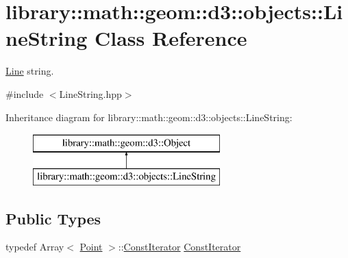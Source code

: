\hypertarget{classlibrary_1_1math_1_1geom_1_1d3_1_1objects_1_1_line_string}{}\section{library\+:\+:math\+:\+:geom\+:\+:d3\+:\+:objects\+:\+:Line\+String Class Reference}
\label{classlibrary_1_1math_1_1geom_1_1d3_1_1objects_1_1_line_string}


\hyperlink{classlibrary_1_1math_1_1geom_1_1d3_1_1objects_1_1_line}{Line} string.  




{\ttfamily \#include $<$Line\+String.\+hpp$>$}

Inheritance diagram for library\+:\+:math\+:\+:geom\+:\+:d3\+:\+:objects\+:\+:Line\+String\+:\begin{figure}[H]
\begin{center}
\leavevmode
\includegraphics[height=2.000000cm]{classlibrary_1_1math_1_1geom_1_1d3_1_1objects_1_1_line_string}
\end{center}
\end{figure}
\subsection*{Public Types}
\begin{DoxyCompactItemize}
\item 
typedef Array$<$ \hyperlink{classlibrary_1_1math_1_1geom_1_1d3_1_1objects_1_1_point}{Point} $>$\+::\hyperlink{classlibrary_1_1math_1_1geom_1_1d3_1_1objects_1_1_line_string_a87db0104282f9fcccdc5b1b99e2301e5}{Const\+Iterator} \hyperlink{classlibrary_1_1math_1_1geom_1_1d3_1_1objects_1_1_line_string_a87db0104282f9fcccdc5b1b99e2301e5}{Const\+Iterator}
\end{DoxyCompactItemize}
